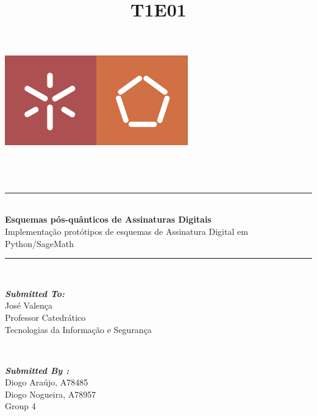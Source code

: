 \documentclass[12pt]{report}
\title{T1E01}
\begin{document}
    
\begin{titlepage}
	\centering
    \vspace*{0.5 cm}
    \includegraphics[scale = 0.50]{logo.png}\\[1.0 cm]	%
	\\[0.1 cm]
	\\[3.0 cm]
	\\[0.5 cm]				%
	\rule{\linewidth}{0.2 mm} \\[0.4 cm]
	{ \huge \bfseries Esquemas pós-quânticos de Assinaturas Digitais}\\[0.3 cm]
	{ \LARGE Implementação protótipos de esquemas de Assinatura Digital em Python/SageMath}
	\rule{\linewidth}{0.2 mm} \\[3.5 cm]
	
	\begin{minipage}{0.4\textwidth}
		\begin{flushleft} \large
			\emph{\textbf{Submitted To:}}\\
			José Valença\\
            Professor Catedrático\\
             Tecnologias da Informação e Segurança\\
			\end{flushleft}
			\end{minipage}~
			\begin{minipage}{0.4\textwidth}
            
			\begin{flushright} \large
			\emph{\textbf{Submitted By :}} \\
			Diogo Araújo, A78485\\
		Diogo Nogueira, A78957\\
            Group 4\\
		\end{flushright}
        
	\end{minipage}\\[2 cm]

	
\end{titlepage}
    
\end{document}
